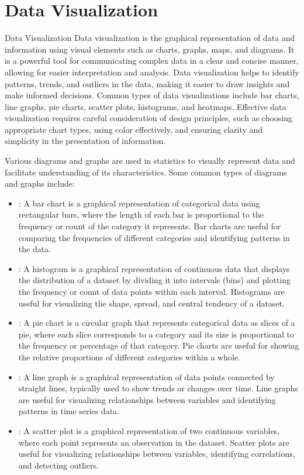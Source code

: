 \documentclass[openany]{book}
\begin{document}
\section{Data Visualization}
\begin{mydefinition}
{Data Visualization}
    Data visualization is the graphical representation of data and information using visual elements such as charts, graphs, maps, and diagrams. It is a powerful tool for communicating complex data in a clear and concise manner, allowing for easier interpretation and analysis. Data visualization helps to identify patterns, trends, and outliers in the data, making it easier to draw insights and make informed decisions. Common types of data visualizations include bar charts, line graphs, pie charts, scatter plots, histograms, and heatmaps. Effective data visualization requires careful consideration of design principles, such as choosing appropriate chart types, using color effectively, and ensuring clarity and simplicity in the presentation of information.
\end{mydefinition}
Various diagrams and graphs are used in statistics to visually represent data and facilitate understanding of its characteristics. Some common types of diagrams and graphs include:
\begin{itemize}
    \item {}: A bar chart is a graphical representation of categorical data using rectangular bars, where the length of each bar is proportional to the frequency or count of the category it represents. Bar charts are useful for comparing the frequencies of different categories and identifying patterns in the data.
    \item {}: A histogram is a graphical representation of continuous data that displays the distribution of a dataset by dividing it into intervals (bins) and plotting the frequency or count of data points within each interval. Histograms are useful for visualizing the shape, spread, and central tendency of a dataset.
    \item {}: A pie chart is a circular graph that represents categorical data as slices of a pie, where each slice corresponds to a category and its size is proportional to the frequency or percentage of that category. Pie charts are useful for showing the relative proportions of different categories within a whole.
    \item {}: A line graph is a graphical representation of data points connected by straight lines, typically used to show trends or changes over time. Line graphs are useful for visualizing relationships between variables and identifying patterns in time series data.
    \item {}: A scatter plot is a graphical representation of two continuous variables, where each point represents an observation in the dataset. Scatter plots are useful for visualizing relationships between variables, identifying correlations, and detecting outliers.
\end{itemize}
\end{document}
